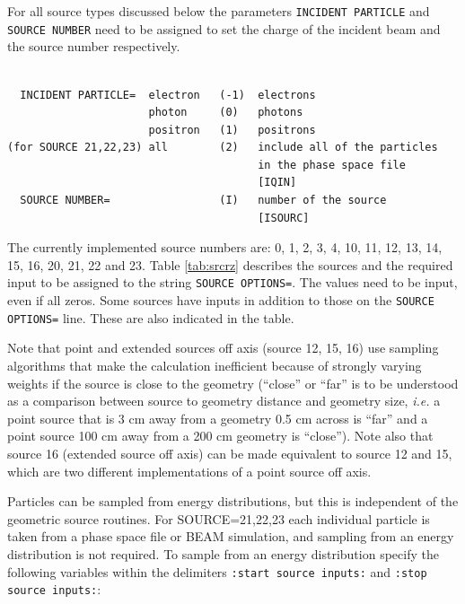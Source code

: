 \documentclass[12pt,twoside]{article}  %
\newcommand{\note}[1]{\mbox{}\\ \noindent \rule{16cm}{0.5mm} \\
{\em #1} \\ \noindent \rule{16cm}{0.5mm}\\
\typeout{******note: #1 *****}
}
\begin{document}
For all source types discussed below the parameters 
\verb+INCIDENT PARTICLE+ and\\ \verb+SOURCE NUMBER+ need to be 
assigned to set the charge of the incident beam and the
source number respectively.

\begin{verbatim}
                                      
  INCIDENT PARTICLE=  electron   (-1)  electrons
                      photon     (0)   photons
                      positron   (1)   positrons
(for SOURCE 21,22,23) all        (2)   include all of the particles
                                       in the phase space file
                                       [IQIN]
  SOURCE NUMBER=                 (I)   number of the source
                                       [ISOURC]
\end{verbatim}
The currently implemented source numbers are: 0, 1, 2, 3, 4, 10,
11, 12, 13, 14, 15, 16, 20, 21, 22 and 23. Table \ref{tab:srcrz}
describes the sources and the required input to be assigned to the
string \verb+SOURCE OPTIONS=+. The values need to be input, even if all
zeros.  Some sources have inputs in addition to those on the
\verb+SOURCE OPTIONS=+ line.  These are also indicated in the table.

Note that point and extended sources off axis (source 12, 15, 16) use 
sampling algorithms that make the calculation inefficient because 
of strongly varying weights if the source is close to the geometry 
(``close'' or ``far'' is to be understood as a comparison between 
source to geometry distance and geometry size, {\em i.e.} a point source 
that is 3 cm away from a geometry 0.5 cm across is ``far'' and a point 
source 100 cm away from a 200 cm geometry is ``close''). Note also 
that source 16 (extended source off axis) can be made equivalent 
to source 12 and 15, which are two different implementations of a point source 
off axis. 



Particles can be sampled from energy distributions, but this is 
independent of the geometric source routines. For SOURCE=21,22,23
each individual particle is taken from a phase space file or BEAM
simulation, and
sampling from an energy distribution is not required. 
To sample from an energy distribution specify the following variables
within the delimiters \verb+:start source inputs:+
and \verb+:stop source inputs:+:
\end{document}
